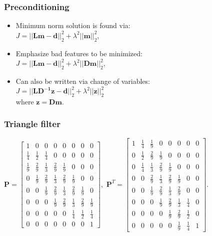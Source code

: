 \begin{frame}
\frametitle{Preconditioning}
\begin{itemize}
\item Minimum norm solution is found via: \\$J = ||\mathbf{Lm}-\mathbf{d}||^2_2 + \lambda^2|| \mathbf{m}||^2_2$, 
\item Emphasize bad features to be minimized:  \\$J = ||\mathbf{Lm}-\mathbf{d}||^2_2 + \lambda^2|| \mathbf{D} \mathbf{m}||^2_2$, 
\item Can also be written via change of variables: \\$J = ||\mathbf{LD^{-1}\mathbf{z}}-\mathbf{d}||^2_2 + \lambda^2|| \mathbf{z}||^2_2$\\
where $\mathbf{z} = \mathbf{Dm}$.
\end{itemize}
\end{frame}

\begin{frame}
\frametitle{Triangle filter}

$\mathbf{P} = \begin{bmatrix}1 & 0 & 0 & 0 & 0 & 0 & 0 & 0 \\
					     \frac{1}{4} & \frac{1}{2} & \frac{1}{4} & 0 & 0 & 0 & 0 & 0 \\
					     \frac{1}{9} & \frac{2}{9} & \frac{1}{3} & \frac{2}{9} & \frac{1}{9} & 0 & 0 & 0 \\
					     0 & \frac{1}{9} & \frac{2}{9} & \frac{1}{3} & \frac{2}{9} & \frac{1}{9} & 0 & 0 \\
					     0 & 0 & \frac{1}{9} & \frac{2}{9} & \frac{1}{3} & \frac{2}{9} & \frac{1}{9} & 0 \\
					     0 & 0 & 0 & \frac{1}{9} & \frac{2}{9} & \frac{1}{3} & \frac{2}{9} & \frac{1}{9} \\
					     0 & 0 & 0 & 0 & 0 & \frac{1}{4} & \frac{1}{2} & \frac{1}{4} \\
					     0 & 0 & 0 & 0 & 0 & 0 & 0 & 1\end{bmatrix},$ 
$\mathbf{P}^T = \begin{bmatrix}1 &  \frac{1}{4} &  \frac{1}{9} & 0 & 0 & 0 & 0 & 0 \\
					     0 &  \frac{1}{2} &  \frac{2}{9} &  \frac{1}{9} & 0 & 0 & 0 & 0 \\
					     0 &  \frac{1}{4} &  \frac{1}{3} &  \frac{2}{9} &  \frac{1}{9} & 0 & 0 & 0 \\
					     0 & 0 &  \frac{2}{9} &  \frac{1}{3} &  \frac{2}{9} &  \frac{1}{9} & 0 & 0 \\
					     0 & 0 &  \frac{1}{9} &  \frac{2}{9} &  \frac{1}{3} &  \frac{2}{9} & 0 & 0 \\
					     0 & 0 & 0 & \frac{1}{9} &  \frac{2}{9} &  \frac{1}{3} &  \frac{1}{4}  & 0 \\
					     0 & 0 & 0 & 0 &  \frac{1}{9} &  \frac{2}{9}  &  \frac{1}{2}  & 0 \\
					     0 & 0 & 0 & 0 & 0 &  \frac{1}{9}  &  \frac{1}{4}  & 1\end{bmatrix}$.
					     
\end{frame}

